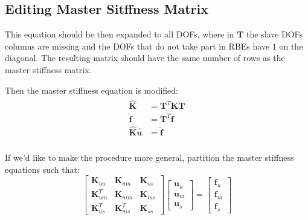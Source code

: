 \documentclass[10pt,b5paper,titlepage]{book}
\newcommand{\m}{\mathbf}
\newenvironment{eqarray}
{
    \begin{eqnarray}
        \begin{aligned}
}
{
        \end{aligned}
    \end{eqnarray}
}
\begin{document}
\subsection{Editing Master Sitffness Matrix}

This equation should be then expanded to all DOFs, where in $ \m{T} $ the
slave DOFs columns are missing and the DOFs that do not take part in RBEs have $ 1 $ on
the diagonal. The resulting  matrix should have the same number of rows as
the master stiffness matrix.

Then the master stiffness equation is modified:
\begin{eqarray}\label{rbe2-master-slave-modified}
    \m{\hat{K}} &= \m{T}^T \m{K} \m{T} \\
    \m{\hat{f}} &= \m{T}^T \m{f} \\
    \m{\hat{K}} \m{\hat{u}} &= \m{\hat{f}} \\
\end{eqarray}

If we'd like to make the procedure more general, partition the master stiffness
equations such that:
\begin{equation}
    \begin{bmatrix}
        \m{K}_{uu} & \m{K}_{um} & \m{K}_{us} \\
        \m{K}_{um}^T & \m{K}_{mm} & \m{K}_{ms} \\
        \m{K}_{us}^T & \m{K}_{ms}^T & \m{K}_{ss}
    \end{bmatrix}
    \begin{bmatrix}
        \m{u}_u \\
        \m{u}_m \\
        \m{u}_s
    \end{bmatrix}
    = \begin{bmatrix}
        \m{f}_u \\
        \m{f}_m \\
        \m{f}_s
    \end{bmatrix}
\end{equation}
\end{document}
